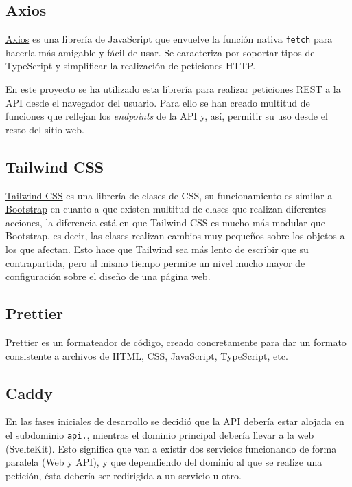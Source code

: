\subsection{Axios}

\href{https://github.com/axios/axios}{Axios} es una librería de JavaScript que
envuelve la función nativa \texttt{fetch} para hacerla más amigable y fácil de
usar. Se caracteriza por soportar tipos de TypeScript y simplificar la
realización de peticiones HTTP.

En este proyecto se ha utilizado esta librería para realizar peticiones REST a
la API desde el navegador del usuario. Para ello se han creado multitud de
funciones que reflejan los \textit{endpoints} de la API y, así, permitir su uso
desde el resto del sitio web.

\subsection{Tailwind CSS}

\href{https://tailwindcss.com/}{Tailwind CSS} es una librería de clases de CSS,
su funcionamiento es similar a \href{https://getbootstrap.com/}{Bootstrap} en
cuanto a que existen multitud de clases que realizan diferentes acciones, la
diferencia está en que Tailwind CSS es mucho más modular que Bootstrap, es
decir, las clases realizan cambios muy pequeños sobre los objetos a los que
afectan. Esto hace que Tailwind sea más lento de escribir que su contrapartida,
pero al mismo tiempo permite un nivel mucho mayor de configuración sobre el
diseño de una página web.

\subsection{Prettier}

\href{https://prettier.io/}{Prettier} es un formateador de código, creado
concretamente para dar un formato consistente a archivos de HTML, CSS,
JavaScript, TypeScript, etc.

\subsection{Caddy}

En las fases iniciales de desarrollo se decidió que la API debería estar alojada
en el subdominio \texttt{api.}, mientras el dominio principal debería llevar a
la web (SvelteKit). Esto significa que van a existir dos servicios funcionando
de forma paralela (Web y API), y que dependiendo del dominio al que se realize
una petición, ésta debería ser redirigida a un servicio u otro.

